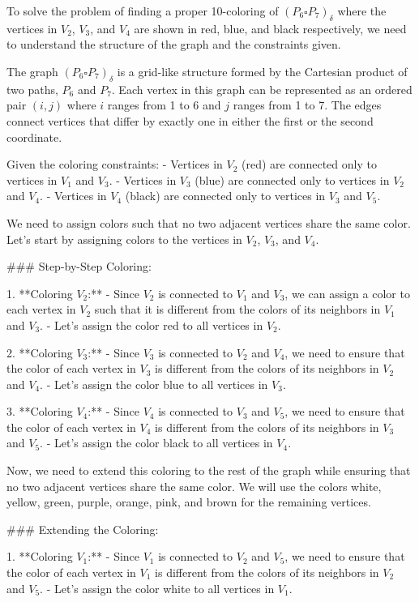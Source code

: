 To solve the problem of finding a proper 10-coloring of \((P_6 \square P_7)_\delta\) where the vertices in \(V_2\), \(V_3\), and \(V_4\) are shown in red, blue, and black respectively, we need to understand the structure of the graph and the constraints given.

The graph \((P_6 \square P_7)_\delta\) is a grid-like structure formed by the Cartesian product of two paths, \(P_6\) and \(P_7\). Each vertex in this graph can be represented as an ordered pair \((i, j)\) where \(i\) ranges from 1 to 6 and \(j\) ranges from 1 to 7. The edges connect vertices that differ by exactly one in either the first or the second coordinate.

Given the coloring constraints:
- Vertices in \(V_2\) (red) are connected only to vertices in \(V_1\) and \(V_3\).
- Vertices in \(V_3\) (blue) are connected only to vertices in \(V_2\) and \(V_4\).
- Vertices in \(V_4\) (black) are connected only to vertices in \(V_3\) and \(V_5\).

We need to assign colors such that no two adjacent vertices share the same color. Let's start by assigning colors to the vertices in \(V_2\), \(V_3\), and \(V_4\).

### Step-by-Step Coloring:

1. **Coloring \(V_2\):**
   - Since \(V_2\) is connected to \(V_1\) and \(V_3\), we can assign a color to each vertex in \(V_2\) such that it is different from the colors of its neighbors in \(V_1\) and \(V_3\).
   - Let's assign the color red to all vertices in \(V_2\).

2. **Coloring \(V_3\):**
   - Since \(V_3\) is connected to \(V_2\) and \(V_4\), we need to ensure that the color of each vertex in \(V_3\) is different from the colors of its neighbors in \(V_2\) and \(V_4\).
   - Let's assign the color blue to all vertices in \(V_3\).

3. **Coloring \(V_4\):**
   - Since \(V_4\) is connected to \(V_3\) and \(V_5\), we need to ensure that the color of each vertex in \(V_4\) is different from the colors of its neighbors in \(V_3\) and \(V_5\).
   - Let's assign the color black to all vertices in \(V_4\).

Now, we need to extend this coloring to the rest of the graph while ensuring that no two adjacent vertices share the same color. We will use the colors white, yellow, green, purple, orange, pink, and brown for the remaining vertices.

### Extending the Coloring:

1. **Coloring \(V_1\):**
   - Since \(V_1\) is connected to \(V_2\) and \(V_5\), we need to ensure that the color of each vertex in \(V_1\) is different from the colors of its neighbors in \(V_2\) and \(V_5\).
   - Let's assign the color white to all vertices in \(V_1\).

